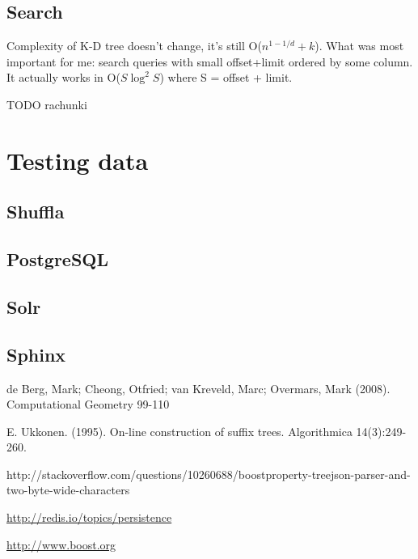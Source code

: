 \documentclass{llncs}
\begin{document}
\subsection{Search}
Complexity of K-D tree doesn't change, it's still O($n^{1-1/d} + k$). What was most important for me: search queries with small offset+limit ordered by some column. It actually works in O($S \log^2 S$) where S = offset + limit. 

TODO rachunki


\section{Testing data}
\subsection{Shuffla}
\subsection{PostgreSQL}
\subsection{Solr}
\subsection{Sphinx}



\begin{thebibliography}{99}

 de Berg, Mark; Cheong, Otfried; van Kreveld, Marc; Overmars, Mark (2008). Computational Geometry 99-110

 E. Ukkonen. (1995). On-line construction of suffix trees. Algorithmica 14(3):249-260.

 http://stackoverflow.com/questions/10260688/boostproperty-treejson-parser-and-two-byte-wide-characters

 \url{http://redis.io/topics/persistence}

 \url{http://www.boost.org}
\end{thebibliography}
\end{document}
